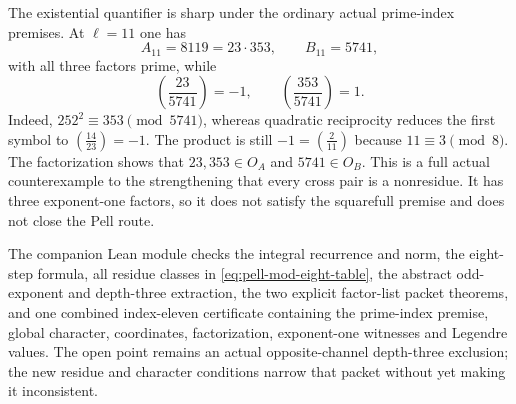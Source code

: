 The existential quantifier is sharp under the ordinary actual prime-index
premises.  At $\ell=11$ one has
\[
 A_{11}=8119=23\cdot353,\qquad B_{11}=5741,
\]
with all three factors prime, while
\[
 \left(\frac{23}{5741}\right)=-1,
 \qquad
 \left(\frac{353}{5741}\right)=1.
\]
Indeed, $252^2\equiv353\pmod {5741}$, whereas quadratic reciprocity reduces
the first symbol to $\left(\frac{14}{23}\right)=-1$.  The product is still
$-1=\left(\frac2{11}\right)$ because $11\equiv3\pmod8$.  The factorization shows that
$23,353\in O_A$ and $5741\in O_B$.  This is a full actual counterexample to
the strengthening that every cross pair is a nonresidue.  It has three exponent-one factors,
so it does not satisfy the squarefull premise and does not close the Pell
route.

The companion Lean module checks the integral recurrence and norm, the
eight-step formula, all residue classes in
\eqref{eq:pell-mod-eight-table}, the abstract odd-exponent and depth-three
extraction, the two explicit factor-list packet theorems, and one combined
index-eleven certificate containing the prime-index premise, global
character, coordinates, factorization, exponent-one witnesses and Legendre
values.  The open point remains an actual
opposite-channel depth-three exclusion; the new residue and character
conditions narrow that packet without yet making it inconsistent.
